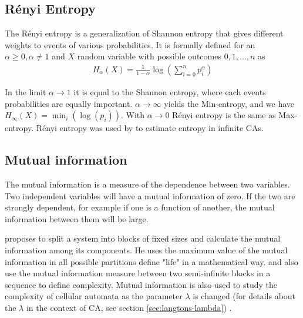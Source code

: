 \subsection{Rényi Entropy}
The Rényi entropy is a generalization of Shannon entropy that gives different
weights to events of various probabilities. It is formally defined for an
$\alpha \geq 0, \alpha \neq 1$ and $X$ random variable with possible outcomes
$0, 1, ..., n$ as
\begin{align*}
  H_\alpha(X) = \frac{1}{1-\alpha} \log\left(\sum_{i=0}^np_i^\alpha\right)
\end{align*}

In the limit $\alpha \rightarrow 1$ it is equal to the Shannon entropy, where
each events probabilities are equally important. $\alpha \rightarrow \infty$
yields the Min-entropy, and we have $H_{\infty} (X) = \min_{i}(\log(p_{i}))$.
With $\alpha \rightarrow 0$ Rényi entropy is the same as Max-entropy. Rényi
entropy was used by \textcite{wolframStatisticalMechanicsCellular1983} to
estimate entropy in infinite CAs.

\subsection{Mutual information}
The mutual information is a measure of the dependence between two variables. Two
independent variables will have a mutual information of zero. If the two are
strongly dependent, for example if one is a function of another, the mutual
information between them will be large.

\textcite{chaitinMathematicalDefinitionLife1987} proposes to split a system into
blocks of fixed sizes and calculate the mutual information among its components.
He uses the maximum value of the mutual information in all possible partitions
define "life" in a mathematical way. \textcite{shawDrippingFaucetModel1984} and
\textcite{grassbergerQuantitativeTheorySelfgenerated1986} also use the mutual
information measure between two semi-infinite blocks in a sequence to define
complexity. Mutual information is also used to study the complexity of cellular
automata as the parameter $\lambda$ is changed (for details about the $\lambda$
in the context of \ac{CA}, see section \ref{sec:langtons-lambda})
\parencite{gutowitzMethodsDesigningCellular1988,
  liTransitionPhenomenaCellular1990}.


